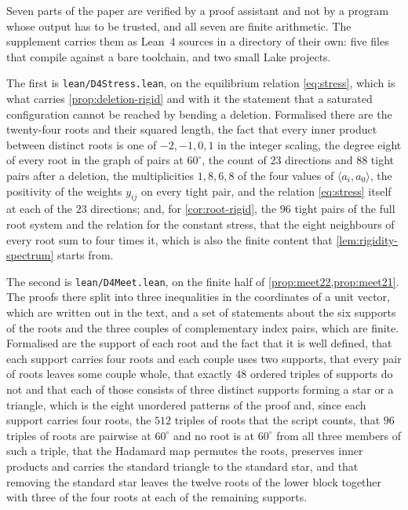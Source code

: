 \documentclass[11pt,reqno]{amsart}
\renewcommand{\_}{\origunderscore\allowbreak}
\numberwithin{equation}{section}
\theoremstyle{plain}
\theoremstyle{definition}
\theoremstyle{remark}
\begin{document}
Seven parts of the paper are verified by a proof assistant and not by a
program whose output has to be trusted, and all seven are finite
arithmetic. The supplement carries them as Lean~4 sources in a directory
of their own: five files that compile against a bare toolchain, and two
small Lake projects.

The first is \texttt{lean/D4Stress.lean}, on the equilibrium relation
\eqref{eq:stress}, which is what carries \cref{prop:deletion-rigid} and
with it the statement that a saturated configuration cannot be reached
by bending a deletion. Formalised there are the twenty-four roots and
their squared length, the fact that every inner product between distinct
roots is one of $-2,-1,0,1$ in the integer scaling, the degree eight of
every root in the graph of pairs at $60^\circ$, the count of $23$
directions and $88$ tight pairs after a deletion, the multiplicities
$1,8,6,8$ of the four values of $\langle a_i,a_0\rangle$, the positivity
of the weights $y_{ij}$ on every tight pair, and the relation
\eqref{eq:stress} itself at each of the $23$ directions; and, for
\cref{cor:root-rigid}, the $96$ tight pairs of the full root system and
the relation for the constant stress, that the eight neighbours of every
root sum to four times it, which is also the finite content that
\cref{lem:rigidity-spectrum} starts from.

The second is \texttt{lean/D4Meet.lean}, on the finite half of
\cref{prop:meet22,prop:meet21}. The proofs there split into three
inequalities in the coordinates of a unit vector, which are written out
in the text, and a set of statements about the six supports of the roots
and the three couples of complementary index pairs, which are finite.
Formalised are the support of each root and the fact that it is well
defined, that each support carries four roots and each couple uses two
supports, that every pair of roots leaves some couple whole, that
exactly $48$ ordered triples of supports do not and that each of those
consists of three distinct supports forming a star or a triangle, which
is the eight unordered patterns of the proof and, since each support
carries four roots, the $512$ triples of roots that the script counts,
that $96$ triples of roots are pairwise at $60^\circ$ and no root is at
$60^\circ$ from all three members of such a triple, that the Hadamard
map permutes the roots, preserves inner products and carries the
standard triangle to the standard star, and that removing the standard
star leaves the twelve roots of the lower block together with three of
the four roots at each of the remaining supports.
\end{document}
